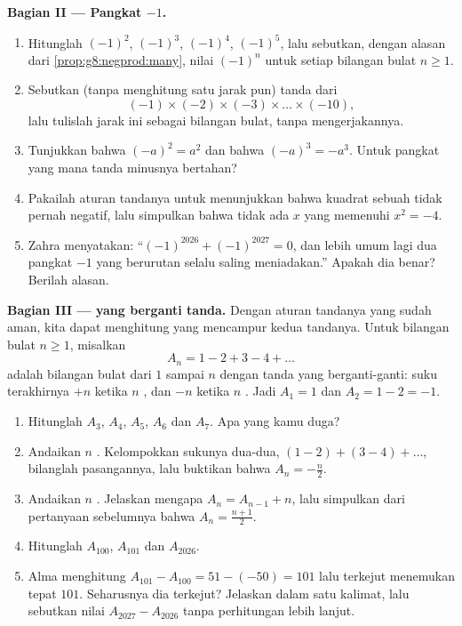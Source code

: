 \begin{problem}
\medskip
\noindent\textbf{Bagian II --- Pangkat $-1$.}
\begin{enumerate}[resume]
  \item Hitunglah $(-1)^2$, $(-1)^3$, $(-1)^4$, $(-1)^5$, lalu
        sebutkan, dengan alasan dari \cref{prop:g8:negprod:many},
        nilai $(-1)^n$ untuk setiap bilangan bulat $n \geq 1$.
  \item Sebutkan (tanpa menghitung satu jarak pun) tanda dari
        \[
        (-1) \times (-2) \times (-3) \times \dots \times (-10),
        \]
        lalu tulislah jarak  ini sebagai 
        bilangan bulat, tanpa mengerjakannya.
  \item Tunjukkan bahwa $(-a)^2 = a^2$ dan bahwa $(-a)^3 = -a^3$.
        Untuk pangkat yang mana tanda minusnya bertahan?
  \item Pakailah aturan tandanya untuk menunjukkan bahwa kuadrat
        sebuah  tidak pernah negatif, lalu simpulkan
        bahwa tidak ada  $x$ yang memenuhi
        $x^2 = -4$.
  \item Zahra menyatakan: ``$(-1)^{2026} + (-1)^{2027} = 0$, dan
        lebih umum lagi dua pangkat $-1$ yang berurutan selalu saling
        meniadakan.'' Apakah dia benar? Berilah alasan.
\end{enumerate}

\medskip
\noindent\textbf{Bagian III ---  yang berganti tanda.}
Dengan aturan tandanya yang sudah aman, kita dapat menghitung 
yang mencampur kedua tandanya. Untuk bilangan bulat $n \geq 1$,
misalkan
\[
A_n = 1 - 2 + 3 - 4 + \dots
\]
adalah  bilangan bulat dari $1$ sampai $n$ dengan tanda yang
berganti-ganti: suku terakhirnya $+n$ ketika $n$ , dan $-n$
ketika $n$ . Jadi $A_1 = 1$ dan $A_2 = 1 - 2 = -1$.
\begin{enumerate}[resume]
  \item Hitunglah $A_3$, $A_4$, $A_5$, $A_6$ dan $A_7$. Apa yang kamu
        duga?
  \item Andaikan $n$ . Kelompokkan sukunya dua-dua,
        $(1 - 2) + (3 - 4) + \dots$, bilanglah pasangannya, lalu
        buktikan bahwa $A_n = -\frac{n}{2}$.
  \item Andaikan $n$ . Jelaskan mengapa $A_n = A_{n-1} + n$,
        lalu simpulkan dari pertanyaan sebelumnya bahwa
        $A_n = \frac{n + 1}{2}$.
  \item Hitunglah $A_{100}$, $A_{101}$ dan $A_{2026}$.
  \item Alma menghitung $A_{101} - A_{100} = 51 - (-50) = 101$ lalu
        terkejut menemukan tepat $101$. Seharusnya dia terkejut?
        Jelaskan dalam satu kalimat, lalu sebutkan nilai
        $A_{2027} - A_{2026}$ tanpa perhitungan lebih lanjut.


\end{enumerate}
\end{problem}
